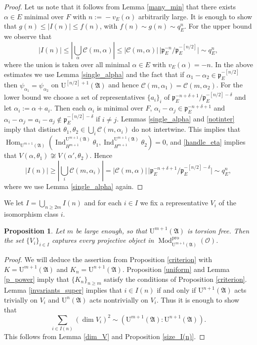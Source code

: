 \documentclass[JEP,XML,SOM,Unicode,NoEqCountersInSection]{cedram}
\let\mathcal\mathscr
\newtheorem{prop}{Proposition}[section]
\theoremstyle{definition}
\DeclareMathOperator{\Hom}{Hom}
\DeclareMathOperator{\Ind}{Ind}
\DeclareMathOperator{\Mod}{Mod}
\newcommand{\Indu}[3]{\Ind_{#1}^{#2}{#3}}
\newcommand{\Aa}{\mathfrak A}
\newcommand{\cO}{\mathcal{O}}
\newcommand{\pp}{\mathfrak p}
\newcommand{\pro}{\mathrm{pro}}
\newcommand{\UU}{\mathrm U}
\begin{document}
\begin{proof} Let us note that it follows from Lemma \ref{many_min} that there exists $\alpha\!\in\!E$ minimal over $F$ with $n\!:=\!-v_E(\alpha)$ arbitrarily large.
It is enough to show that \hbox{$g(n)\!\le\!| I(n)|\!\le\!f(n)$}, with $f(n)\sim g(n) \sim q_E^n$. For the upper bound we observe that
\[\textstyle
| I(n)| \le |\bigcup_{\alpha} \mathcal C(m, \alpha)| \le |\mathcal C(m, \alpha)|\, \bigl| \pp_E^{-n}/ \pp_E^{-[n/2]}\bigr| \sim q_E^n,
\]
where the union is taken over all minimal $\alpha\in E$ with $v_E(\alpha)=-n$. In the above estimates we use Lemma \ref{single_alpha} and
the fact that if $\alpha_1-\alpha_2\in \pp_E^{-[n/2]}$ then $\psi_{\alpha_1}=\psi_{\alpha_2}$ on $\UU^{[n/2]+1}(\Aa)$ and hence $\mathcal C(m, \alpha_1)=\mathcal C(m, \alpha_2)$.
For the lower bound we choose a set of representatives $\{a_i\}_i$ of $\pp_E^{-n+\delta+1}/\pp_E^{-[n/2]-\delta}$ and let $\alpha_i:= \alpha+a_i$. Then each $\alpha_i$ is minimal over $F$,
$\alpha_i - \alpha_j \in \pp_E^{-n +\delta+1}$ and $\alpha_i -\alpha_j= a_i-a_j\not \in \pp_E^{-[n/2]-\delta}$ if $i\neq j$. Lemmas \ref{single_alpha} and \ref{notinter} imply that
distinct $\theta_1, \theta_2\in \bigcup_i \mathcal C(m, \alpha_i)$ do not intertwine. This implies that $\Hom_{\UU^{m+1}(\Aa)}(\Indu{H^{m+1}}{\UU^{m+1}(\Aa)}{\theta_1},
\Indu{H^{m+1}}{\UU^{m+1}(\Aa)}{\theta_2})=0$, and \eqref{handle_eta} implies that
$V(\alpha, \theta_1)\not\cong V(\alpha', \theta_2)$. Hence
\[\textstyle
|I(n)|\ge |\bigcup_i \mathcal C(m, \alpha_i)|= |\mathcal C(m, \alpha)|\, \bigl| \pp_E^{-n+\delta+1}/\pp_E^{-[n/2]-\delta}\bigr|\sim q_E^n,
\]
where we use Lemma \ref{single_alpha} again.
\end{proof}

We let $I=\bigcup_{n\ge 2m} I(n)$ and for each $i\in I$ we fix a representative $V_i$ of the isomorphism class $i$.

\begin{prop}\label{capture_super} Let $m$ be large enough, so that $\UU^{m+1}(\Aa)$ is torsion free. Then the set $\{V_i\}_{i\in I}$ captures every projective object in $\Mod^{\pro}_{\UU^{m+1}(\Aa)}(\cO)$.
\end{prop}

\begin{proof} We will deduce the assertion from Proposition \ref{criterion} with $K=\UU^{m+1}(\Aa)$ and $K_n=\UU^{n+1}(\Aa)$. Proposition \ref{uniform} and Lemma \ref{p_power} imply that
$\{K_n\}_{n\ge m}$ satisfy the conditions of Proposition \ref{criterion}. Lemma \ref{invariants_super} implies that $i\in I(n)$ if and only if $\UU^{n+1}(\Aa)$ acts trivially on $V_i$ and
$\UU^n(\Aa)$ acts nontrivially on $V_i$. Thus it is enough to show that
\[
\sum_{i\in I(n)} (\dim V_i)^2 \sim (\UU^{m+1}(\Aa): \UU^{n+1}(\Aa)).
\]
This follows from Lemma \ref{dim_V} and Proposition \ref{size_I(n)}.
\end{proof}
\end{document}
